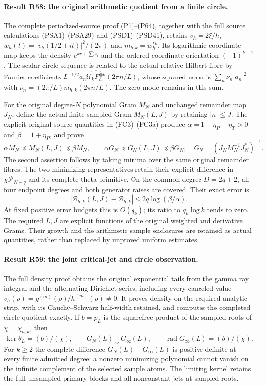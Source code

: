 \paragraph{Result R58: the original arithmetic quotient from a finite circle.}
The complete periodized-source proof (P1)--(P64), together with the
full source calculations (PSA1)--(PSA29) and (PSD1)--(PSD41), retains
$v_h=2\xi/h$, $w_h(t)=|v_h(1/2+it)|^2/(2\pi)$ and
$m_{h,k}=w_h^{*k}$. Its logarithmic coordinate map keeps the density
$e^{kr+\sum z_i}$ and the ordered-coordinate orientation
$(-1)^{k-1}$. The scalar circle sequence is related to the actual
relative Hilbert fibre by Fourier coefficients
$L^{-1/2}a_n\widehat{\mathcal U_kF_h^{\otimes k}}(2\pi n/L)$,
whose squared norm is $\sum_n\nu_n|a_n|^2$ with
$\nu_n=(2\pi/L)m_{h,k}(2\pi n/L)$. The zero mode remains in this sum.

For the original degree-$N$ polynomial Gram $M_N$ and unchanged
remainder map $J_N$, define the actual finite sampled Gram
$M_N(L,J)$ by retaining $|n|\le J$. The explicit original-source
quantities in (FC3)--(FC3a) produce
$\alpha=1-\eta_P-\eta_T>0$ and $\beta=1+\eta_P$, and prove
\[
 \alpha M_N\preceq M_N(L,J)\preceq\beta M_N,\qquad
 \alpha G_N\preceq G_N(L,J)\preceq\beta G_N,
 \quad G_N=(J_NM_N^{-1}J_N^*)^{-1}.
\]
The second assertion follows by taking minima over the same original
remainder fibres. The two minimizing representatives retain their
explicit difference in $\chi\mathcal P_{N-q}$ and its complete
theta primitive. On the common degree $D=2q+2$, all four endpoint
degrees and both generator raises are covered. Their exact error is
\[
 \left|\mathcal B_{h,k}(L,J)-\mathcal B_{h,k}\right|
      \le2q\log(\beta/\alpha).
\]
At fixed positive error budgets this is $O(q_k)$; its ratio to
$q_k\log k$ tends to zero. The required $L,J$ are explicit functions
of the original weighted and derivative Grams. Their growth and the
arithmetic sample enclosures are retained as actual quantities, rather
than replaced by unproved uniform estimates.

\paragraph{Result R59: the joint critical-jet and circle observation.}
The full density proof obtains the original exponential tails from
the gamma ray integral and the alternating Dirichlet series, including
every canceled value $v_h(\rho)=g^{(m)}(\rho)/h^{(m)}(\rho)\ne0$.
It proves density on the required analytic strip, with its
Cauchy--Schwarz half-width retained, and computes the completed circle
quotient exactly. If $b=p_L$ is the squarefree product of the sampled
roots of $\chi=\chi_{h,k}$, then
\[
 \ker\theta_L=(b)/(\chi),\qquad
 G_N(L)\downarrow G_\infty(L),\qquad
 \operatorname{rad}G_\infty(L)=(b)/(\chi).
\]
For $k\ge2$ the complete difference $G_N(L)-G_\infty(L)$ is
positive definite at every finite admitted degree: a nonzero
minimizing polynomial cannot vanish on the infinite complement of
the selected sample atoms. The limiting kernel retains the full
unsampled primary blocks and all nonconstant jets at sampled roots.

